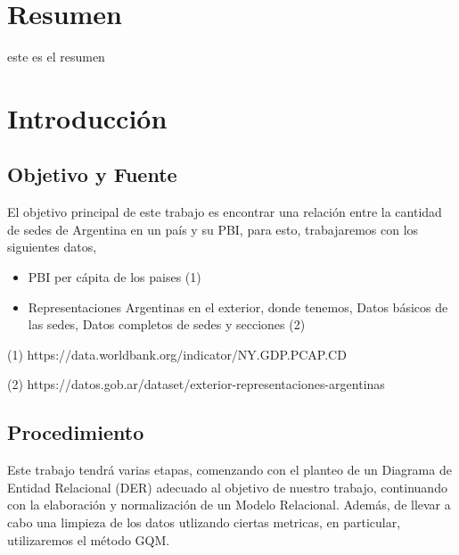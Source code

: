 \documentclass[10pt,a4paper]{article}
\begin{document}

\maketitle

\restoregeometry


\section{Resumen}
este es el resumen


\section{Introducción} \vspace{0.1cm}

\subsection{Objetivo y Fuente} \vspace{0.1cm}

El objetivo principal de este trabajo es encontrar una relación entre la cantidad de sedes de Argentina en un país y su PBI, para esto, trabajaremos con los siguientes datos, 

\begin{itemize}
	\item PBI per cápita de los paises (1)
	\item Representaciones Argentinas en el exterior, donde tenemos, Datos básicos de las sedes, Datos completos de sedes y secciones (2)
\end{itemize}

\noindent (1) https://data.worldbank.org/indicator/NY.GDP.PCAP.CD \vspace {0.1cm}

\noindent (2) https://datos.gob.ar/dataset/exterior-representaciones-argentinas \vspace{0.1cm}
 
\subsection{Procedimiento}

\indent Este trabajo tendrá varias etapas, comenzando con el planteo de un Diagrama de Entidad Relacional (DER) adecuado al objetivo de nuestro trabajo, continuando con la elaboración y normalización de un Modelo Relacional. Además, de llevar a cabo una limpieza de los datos utlizando ciertas metricas, en particular, utilizaremos el método GQM. \par
\end{document}

